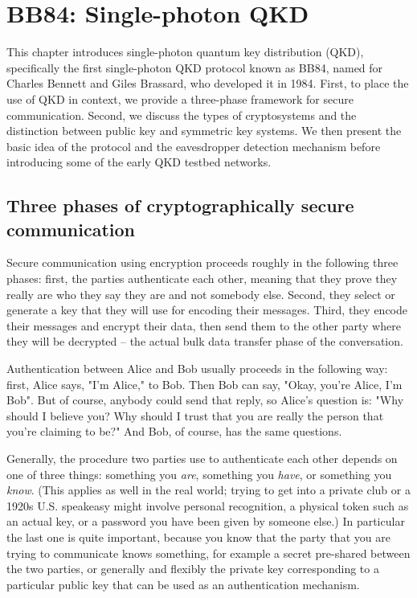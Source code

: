 \chapter{BB84: Single-photon QKD}
\label{sec:9_bb84}

This chapter introduces single-photon quantum key distribution (QKD), specifically the first single-photon QKD protocol known as BB84, named for Charles Bennett and Giles Brassard, who developed it in 1984. First, to place the use of QKD in context, we provide a three-phase framework for secure communication. Second, we discuss the types of cryptosystems and the distinction between public key and symmetric key systems. We then present the basic idea of the protocol and the eavesdropper detection mechanism before introducing some of the early QKD testbed networks.

\section{Three phases of cryptographically secure communication}


Secure communication using encryption proceeds roughly in the following three phases: first, the parties authenticate each other, meaning that they prove they really are who they say they are and not somebody else. Second, they select or generate a key that they will use for encoding their messages.  Third, they encode their messages and encrypt their data, then send them to the other party where they will be decrypted -- the actual bulk data transfer phase of the conversation.

Authentication between Alice and Bob usually proceeds in the following way: first, Alice says, "I'm Alice," to Bob. Then Bob can say, "Okay, you're Alice, I'm Bob". But of course, anybody could send that reply, so Alice's question is: "Why should I believe you? Why should I trust that you are really the person that you're claiming to be?" And Bob, of course, has the same questions.

Generally, the procedure two parties use to authenticate each other depends on one of three things: something you \emph{are}, something you \emph{have}, or something you \emph{know}. (This applies as well in the real world; trying to get into a private club or a 1920s U.S. speakeasy might involve personal recognition, a physical token such as an actual key, or a password you have been given by someone else.)  In particular the last one is quite important, because you know that the party that you are trying to communicate knows something, for example a secret pre-shared between the two parties, or generally and flexibly the private key corresponding to a particular public key that can be used as an authentication mechanism.

